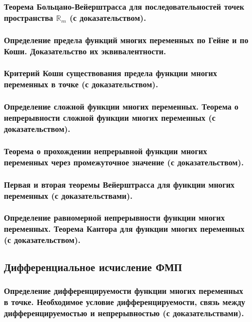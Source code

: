 \documentclass[10pt]{article}
\begin{document}
    \subsubsection{Теорема Больцано-Вейерштрасса для последовательностей точек пространства \texorpdfstring{$\mathbb{R}_m$}{Rm} (с доказательством).}
    \subsubsection{Определение предела функций многих переменных по Гейне и по Коши. Доказательство их эквивалентности.}
    \subsubsection{Критерий Коши существования предела функции многих переменных в точке (с доказательством).}
    \subsubsection{Определение сложной функции многих переменных. Теорема о непрерывности сложной функции многих переменных (с доказательством).}
    \subsubsection{Теорема о прохождении непрерывной функции многих переменных через промежуточное значение (с доказательством).}
    \subsubsection{Первая и вторая теоремы Вейерштрасса для функции многих переменных (с доказательствами).}
    \subsubsection{Определение равномерной непрерывности функции многих переменных. Теорема Кантора для функции многих переменных (с доказательством).}
    \subsection{Дифференциальное исчисление ФМП}
    \subsubsection{Определение дифференцируемости функции многих переменных в точке. Необходимое условие дифференцируемости, связь между дифференцируемостью и непрерывностью (с доказательствами).}
\end{document}
